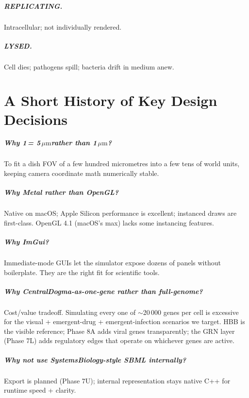 \documentclass[11pt,letterpaper,twoside,openany]{book}
\newcommand{\wu}{\text{wu}}
\newcommand{\um}{\ensuremath{\mu\text{m}}}
\begin{document}
\paragraph{REPLICATING.} Intracellular; not individually
rendered.
\paragraph{LYSED.} Cell dies; pathogens spill; bacteria drift in
medium anew.

\chapter{A Short History of Key Design Decisions}
\label{ch:decisions}

\paragraph{Why 1\,\wu = 5\,\um rather than 1\,\um?} To fit a
dish FOV of a few hundred micrometres into a few tens of world
units, keeping camera coordinate math numerically stable.

\paragraph{Why Metal rather than OpenGL?} Native on macOS; Apple
Silicon performance is excellent; instanced draws are
first-class. OpenGL 4.1 (macOS's max) lacks some instancing
features.

\paragraph{Why ImGui?} Immediate-mode GUIs let the simulator
expose dozens of panels without boilerplate. They are the right
fit for scientific tools.

\paragraph{Why CentralDogma-as-one-gene rather than
full-genome?} Cost/value tradeoff. Simulating every one of
$\sim$20\,000 genes per cell is excessive for the visual +
emergent-drug + emergent-infection scenarios we target. HBB is
the visible reference; Phase 8A adds viral genes transparently;
the GRN layer (Phase 7L) adds regulatory edges that operate on
whichever genes are active.

\paragraph{Why not use SystemsBiology-style SBML
internally?} Export is planned (Phase 7U); internal
representation stays native C++ for runtime speed + clarity.
\end{document}
